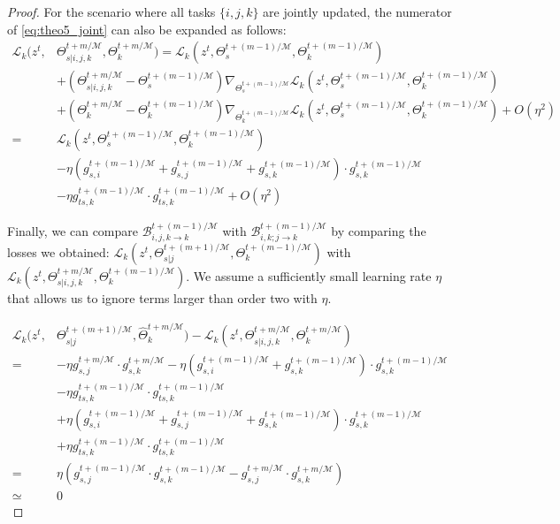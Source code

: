 \begin{proof}
For the scenario where all tasks $\{i, j, k\}$ are jointly updated, the numerator of \cref{eq:theo5_joint} can also be expanded as follows:
\begin{align}
    \mathcal{L}_k(z^t,& \Theta_{s|i,j,k}^{t+m/\mathcal{M}}, \Theta_k^{t+m/\mathcal{M}}) = \mathcal{L}_k (z^t, \Theta_s^{t+(m-1)/\mathcal{M}}, \Theta_k^{t+(m-1)/\mathcal{M}})\\
    &+(\Theta_{s|i,j,k}^{t+m/\mathcal{M}} - \Theta_s^{t+(m-1)/\mathcal{M}}) \nabla_{\Theta_s^{t+(m-1)/\mathcal{M}}} \mathcal{L}_k (z^t, \Theta_s^{t+(m-1)/\mathcal{M}}, \Theta_k^{t+(m-1)/\mathcal{M}})\\
    &+(\Theta_k^{t+m/\mathcal{M}} - \Theta_k^{t+(m-1)/\mathcal{M}}) \nabla_{\Theta_k^{t+(m-1)/\mathcal{M}}} \mathcal{L}_k (z^t, \Theta_s^{t+(m-1)/\mathcal{M}}, \Theta_k^{t+(m-1)/\mathcal{M}}) + O(\eta^2)\\
    =& \mathcal{L}_k (z^t, \Theta_s^{t+(m-1)/\mathcal{M}}, \Theta_k^{t+(m-1)/\mathcal{M}}) \\
    &- \eta (g_{s,i}^{t+(m-1)/\mathcal{M}} + g_{s,j}^{t+(m-1)/\mathcal{M}} + g_{s,k}^{t+(m-1)/\mathcal{M}})\cdot g_{s,k}^{t+(m-1)/\mathcal{M}} \\
    &- \eta g_{ts,k}^{t+(m-1)/\mathcal{M}}\cdot g_{ts,k}^{t+(m-1)/\mathcal{M}} + O(\eta^2)
\end{align}

Finally, we can compare $\mathcal{B}_{i,j,k \rightarrow k}^{t+(m-1)/\mathcal{M}}$ with $\mathcal{B}_{i,k; j \rightarrow k}^{t+(m-1)/\mathcal{M}}$ by comparing the losses we obtained: $\mathcal{L}_k(z^t, \Theta_{s|j}^{t+(m+1)/\mathcal{M}}, \Theta_k^{t+(m-1)/\mathcal{M}})$ with $\mathcal{L}_k(z^t, \Theta_{s|i,j,k}^{t+m/\mathcal{M}}, \Theta_k^{t+(m-1)/\mathcal{M}})$. We assume a sufficiently small learning rate $\eta$ that allows us to ignore terms larger than order two with $\eta$.

\begin{align}
    \mathcal{L}_k(z^t, & \Theta_{s|j}^{t+(m+1)/\mathcal{M}}, \hat{\Theta}_k^{t+m/\mathcal{M}}) - \mathcal{L}_k(z^t, \Theta_{s|i,j,k}^{t+m/\mathcal{M}}, \Theta_k^{t+m/\mathcal{M}})\\
    =& - \eta g_{s,j}^{t+m/\mathcal{M}}\cdot g_{s,k}^{t+m/\mathcal{M}} - \eta (g_{s,i}^{t+(m-1)/\mathcal{M}} + g_{s,k}^{t+(m-1)/\mathcal{M}})\cdot g_{s,k}^{t+(m-1)/\mathcal{M}} \\
    & - \eta g_{ts,k}^{t+(m-1)/\mathcal{M}}\cdot g_{ts,k}^{t+(m-1)/\mathcal{M}}\\
    &+ \eta (g_{s,i}^{t+(m-1)/\mathcal{M}} + g_{s,j}^{t+(m-1)/\mathcal{M}} + g_{s,k}^{t+(m-1)/\mathcal{M}})\cdot g_{s,k}^{t+(m-1)/\mathcal{M}}\\
    & + \eta g_{ts,k}^{t+(m-1)/\mathcal{M}}\cdot g_{ts,k}^{t+(m-1)/\mathcal{M}}\\
    =& \eta(g_{s,j}^{t+(m-1)/\mathcal{M}} \cdot g_{s,k}^{t+(m-1)/\mathcal{M}} - g_{s,j}^{t+m/\mathcal{M}} \cdot g_{s,k}^{t+m/\mathcal{M}})\\
    \simeq& 0 \label{eq:theo5_last1}
\end{align}


\end{proof}
